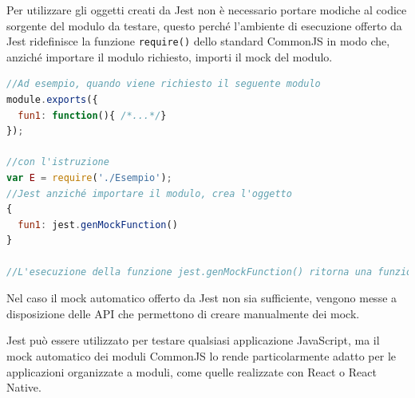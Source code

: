 Per utilizzare gli oggetti creati da Jest non è necessario portare modiche al codice sorgente del modulo da testare, questo perché l'ambiente di esecuzione offerto da Jest ridefinisce la funzione \texttt{require()} dello standard CommonJS in modo che, anziché importare il modulo richiesto, importi il mock del modulo.

\begin{lstlisting}[language=JavaScript, caption=Esempio di mock creato da Jest]
//Ad esempio, quando viene richiesto il seguente modulo
module.exports({
  fun1: function(){ /*...*/}
});

//con l'istruzione
var E = require('./Esempio');
//Jest anziché importare il modulo, crea l'oggetto
{
  fun1: jest.genMockFunction()
}

//L'esecuzione della funzione jest.genMockFunction() ritorna una funzione con il corpo vuoto e con un campo dati .mock che, durante l'esecuzione del test, andrà a contenere le informazioni riguardo le varie invocazioni della funzione.
\end{lstlisting}

Nel caso il mock automatico offerto da Jest non sia sufficiente, vengono messe a disposizione delle API che permettono di creare manualmente dei mock.

Jest può essere utilizzato per testare qualsiasi applicazione JavaScript, ma il mock automatico dei moduli CommonJS lo rende particolarmente adatto per le applicazioni organizzate a moduli, come quelle realizzate con React o React Native.